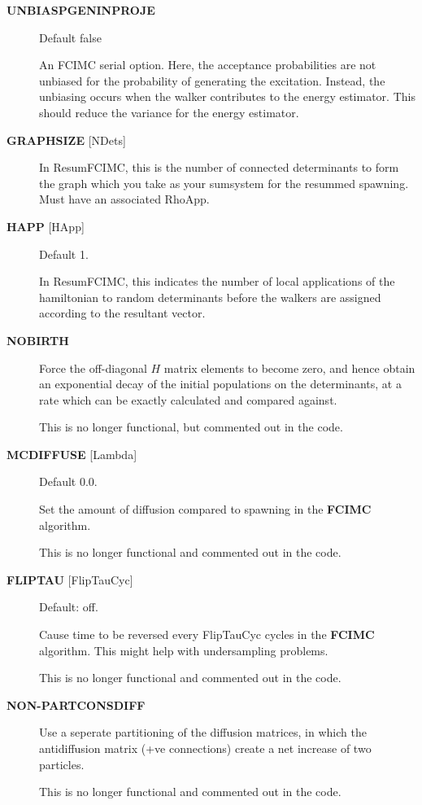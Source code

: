 \documentclass[openany,a4paper,10pt]{manual}
\begin{document}
\begin{description}
\item[\textbf{UNBIASPGENINPROJE}]
Default false

An FCIMC serial option. Here, the acceptance probabilities are not unbiased for
the probability of generating the excitation. Instead, the unbiasing occurs when the
walker contributes to the energy estimator. This should reduce the variance for the
energy estimator.

\item[\textbf{GRAPHSIZE} {[}NDets{]}]
In ResumFCIMC, this is the number of connected determinants to form the
graph which you take as your sumsystem for the resummed spawning.  Must
have an associated RhoApp.

\item[\textbf{HAPP} {[}HApp{]}]
Default 1.

In ResumFCIMC, this indicates the number of local applications of the
hamiltonian to random determinants before the walkers are assigned
according to the resultant vector.

\item[\textbf{NOBIRTH}]
Force the off-diagonal $H$ matrix elements to become zero,
and hence obtain an exponential decay of the initial populations
on the determinants, at a rate which can be exactly calculated and
compared against.

This is no longer functional, but commented out in the
code.

\item[\textbf{MCDIFFUSE} {[}Lambda{]}]
Default 0.0.

Set the amount of diffusion compared to spawning in the \textbf{FCIMC}
algorithm.

This is no longer functional and commented out in the code.

\item[\textbf{FLIPTAU} {[}FlipTauCyc{]}]
Default: off.

Cause time to be reversed every FlipTauCyc cycles in the \textbf{FCIMC}
algorithm. This might help with undersampling problems.

This is no longer functional and commented out in the code.

\item[\textbf{NON-PARTCONSDIFF}]
Use a seperate partitioning of the diffusion matrices, in which
the antidiffusion matrix (+ve connections) create a net increase of
two particles.

This is no longer functional and commented out in the code.


\end{description}
\end{document}
